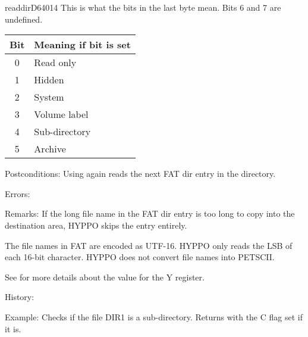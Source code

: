 \begin{hyppotrap}{readdir}{D640}{14}
  This is what the bits in the last byte mean. Bits 6 and 7 are undefined.
  {\setlength{\tabcolsep}{2mm}
  \begin{tabular}{|c|l|}
  \hline
  \textbf{Bit} & \textbf{Meaning if bit is set} \\
  \hline
  0 & Read only         \\
  1 & Hidden            \\
  2 & System            \\
  3 & Volume label      \\
  4 & Sub-directory     \\
  5 & Archive           \\
  \hline
  \end{tabular}
  }
\item [Postconditions:]
  Using  again reads the next FAT dir entry in the directory.
\item [Errors:]
\item [Remarks:]
  If the long file name in the FAT dir entry is too long to copy into the
  destination area, HYPPO skips the entry entirely.

  The file names in FAT are encoded as UTF-16. HYPPO only reads the LSB
  of each 16-bit character. HYPPO does not convert file names into
  PETSCII.

  See  for more details about the value for the
  Y register.
\item [History:]
\item [Example:]
  Checks if the file DIR1 is a sub-directory. Returns with the C flag set if it
  is.

  \TODO
\end{hyppotrap}


